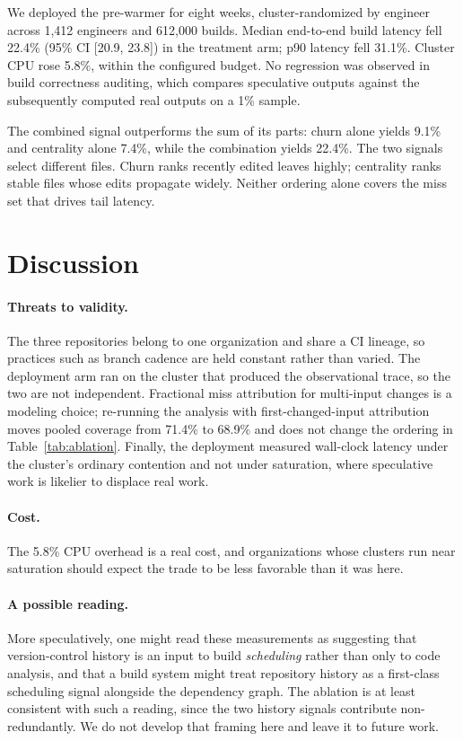 \documentclass{anvil-paper}
\begin{document}
We deployed the pre-warmer for eight weeks, cluster-randomized by engineer
across 1{,}412 engineers and 612{,}000 builds. Median end-to-end build latency
fell 22.4\% (95\% CI [20.9, 23.8]) in the treatment arm; p90 latency fell
31.1\%. Cluster CPU rose 5.8\%, within the configured budget. No regression
was observed in build correctness auditing, which compares speculative outputs
against the subsequently computed real outputs on a 1\% sample.

The combined signal outperforms the sum of its parts: churn alone yields 9.1\%
and centrality alone 7.4\%, while the combination yields 22.4\%. The two
signals select different files. Churn ranks recently edited leaves highly;
centrality ranks stable files whose edits propagate widely. Neither ordering
alone covers the miss set that drives tail latency.

\section{Discussion}
\label{sec:discussion}

\paragraph{Threats to validity.}
The three repositories belong to one organization and share a CI lineage, so
practices such as branch cadence are held constant rather than varied. The
deployment arm ran on the cluster that produced the observational trace, so
the two are not independent. Fractional miss attribution for multi-input
changes is a modeling choice; re-running the analysis with
first-changed-input attribution moves pooled coverage from 71.4\% to 68.9\%
and does not change the ordering in Table~\ref{tab:ablation}. Finally, the
deployment measured wall-clock latency under the cluster's ordinary contention
and not under saturation, where speculative work is likelier to displace real
work.

\paragraph{Cost.}
The 5.8\% CPU overhead is a real cost, and organizations whose clusters run
near saturation should expect the trade to be less favorable than it was here.

\paragraph{A possible reading.}
More speculatively, one might read these measurements as suggesting that
version-control history is an input to build \emph{scheduling} rather than
only to code analysis, and that a build system might treat repository history
as a first-class scheduling signal alongside the dependency graph. The
ablation is at least consistent with such a reading, since the two history
signals contribute non-redundantly. We do not develop that framing here and
leave it to future work.
\end{document}
